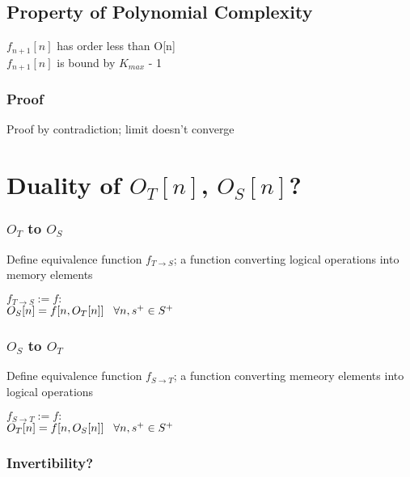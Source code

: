\documentclass[11pt]{article}
\begin{document}
\subsection{Property of Polynomial Complexity}
$f_{n+1}[n]$ has order less than O[n]\\
$f_{n+1}[n]$ is bound by $K_{max}$ - 1
\subsubsection{Proof}
Proof by contradiction; limit doesn't converge














\newpage
\section{Duality of $O_T[n]$, $O_S[n]$?}
\subsubsection{$O_T$ to $O_S$}
Define equivalence function $f_{T \rightarrow S}$; a function converting logical operations into memory elements
\begin{center}
$
f_{T \rightarrow S} := f :
$
\\ \vspace{2mm}
$
O_S[n] = f[n,O_T[n]] \hspace{3mm} \forall n, s^+ \in S^+
$
\end{center}

\subsubsection{$O_S$ to $O_T$}
Define equivalence function $f_{S \rightarrow T}$; a function converting memeory elements into logical operations
\begin{center}
$
f_{S \rightarrow T} := f :
$
\\ \vspace{2mm}
$
O_T[n] = f[n,O_S[n]] \hspace{3mm} \forall n, s^+ \in S^+
$
\end{center}


\subsubsection{Invertibility?}
\end{document}
